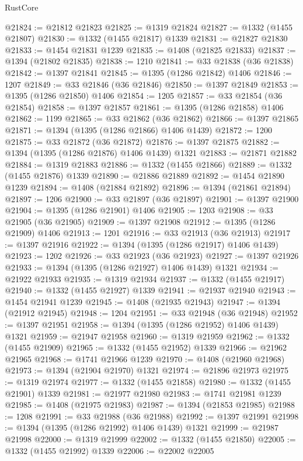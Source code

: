 \begin{lexlean}{RustCore}
\begin{coremodule}
@21824 := @21812 @21823
@21825 := @1319 @21824
@21827 := @1332 (@1455 @21807)
@21830 := @1332 (@1455 @21817) @1339
@21831 := @21827 @21830
@21833 := @1454 @21831 @1239
@21835 := @1408 (@21825 @21833)
@21837 := @1394 (@21802 @21835)
@21838 := 1210
@21841 := @33 @21838 (@36 @21838)
@21842 := @1397 @21841
@21845 := @1395 (@1286 @21842) @1406
@21846 := 1207
@21849 := @33 @21846 (@36 @21846)
@21850 := @1397 @21849
@21853 := @1395 (@1286 @21850) @1406
@21854 := 1205
@21857 := @33 @21854 (@36 @21854)
@21858 := @1397 @21857
@21861 := @1395 (@1286 @21858) @1406
@21862 := 1199
@21865 := @33 @21862 (@36 @21862)
@21866 := @1397 @21865
@21871 := @1394 (@1395 (@1286 @21866) @1406 @1439)
@21872 := 1200
@21875 := @33 @21872 (@36 @21872)
@21876 := @1397 @21875
@21882 := @1394 (@1395 (@1286 @21876) @1406 @1439) @1321
@21883 := @21871 @21882
@21884 := @1319 @21883
@21886 := @1332 (@1455 @21866)
@21889 := @1332 (@1455 @21876) @1339
@21890 := @21886 @21889
@21892 := @1454 @21890 @1239
@21894 := @1408 (@21884 @21892)
@21896 := @1394 (@21861 @21894)
@21897 := 1206
@21900 := @33 @21897 (@36 @21897)
@21901 := @1397 @21900
@21904 := @1395 (@1286 @21901) @1406
@21905 := 1203
@21908 := @33 @21905 (@36 @21905)
@21909 := @1397 @21908
@21912 := @1395 (@1286 @21909) @1406
@21913 := 1201
@21916 := @33 @21913 (@36 @21913)
@21917 := @1397 @21916
@21922 := @1394 (@1395 (@1286 @21917) @1406 @1439)
@21923 := 1202
@21926 := @33 @21923 (@36 @21923)
@21927 := @1397 @21926
@21933 := @1394 (@1395 (@1286 @21927) @1406 @1439) @1321
@21934 := @21922 @21933
@21935 := @1319 @21934
@21937 := @1332 (@1455 @21917)
@21940 := @1332 (@1455 @21927) @1339
@21941 := @21937 @21940
@21943 := @1454 @21941 @1239
@21945 := @1408 (@21935 @21943)
@21947 := @1394 (@21912 @21945)
@21948 := 1204
@21951 := @33 @21948 (@36 @21948)
@21952 := @1397 @21951
@21958 := @1394 (@1395 (@1286 @21952) @1406 @1439) @1321
@21959 := @21947 @21958
@21960 := @1319 @21959
@21962 := @1332 (@1455 @21909)
@21965 := @1332 (@1455 @21952) @1339
@21966 := @21962 @21965
@21968 := @1741 @21966 @1239
@21970 := @1408 (@21960 @21968)
@21973 := @1394 (@21904 @21970) @1321
@21974 := @21896 @21973
@21975 := @1319 @21974
@21977 := @1332 (@1455 @21858)
@21980 := @1332 (@1455 @21901) @1339
@21981 := @21977 @21980
@21983 := @1741 @21981 @1239
@21985 := @1408 (@21975 @21983)
@21987 := @1394 (@21853 @21985)
@21988 := 1208
@21991 := @33 @21988 (@36 @21988)
@21992 := @1397 @21991
@21998 := @1394 (@1395 (@1286 @21992) @1406 @1439) @1321
@21999 := @21987 @21998
@22000 := @1319 @21999
@22002 := @1332 (@1455 @21850)
@22005 := @1332 (@1455 @21992) @1339
@22006 := @22002 @22005

\end{coremodule}
\end{lexlean}
